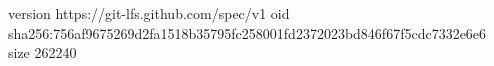 version https://git-lfs.github.com/spec/v1
oid sha256:756af9675269d2fa1518b35795fc258001fd2372023bd846f67f5cdc7332e6e6
size 262240

